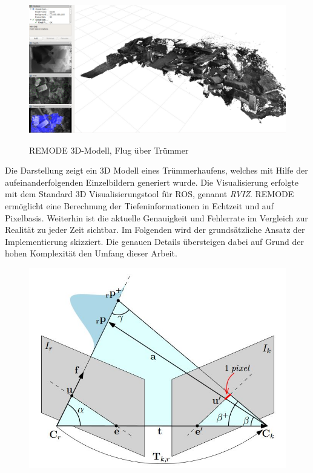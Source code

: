 \begin{figure}[ht]
	\centering
	\includegraphics[scale=0.22]{Bilder/remode_3dmodel.jpg}
	\label{fig:pinhole}
	\caption{REMODE 3D-Modell, Flug über Trümmer \cite{remode3d}}
\end{figure}

Die Darstellung zeigt ein 3D Modell eines Trümmerhaufens, welches mit Hilfe der aufeinanderfolgenden Einzelbildern generiert wurde. Die Visualisierung erfolgte mit dem Standard 3D Visualisierungstool für ROS, genannt \textit{RVIZ}. \newline
REMODE ermöglicht eine Berechnung der Tiefeninformationen in Echtzeit und auf Pixelbasis. Weiterhin ist die aktuelle Genauigkeit und Fehlerrate im Vergleich zur Realität zu jeder Zeit sichtbar. \newline
Im Folgenden wird der grundsätzliche Ansatz der Implementierung skizziert. Die genauen Details übersteigen dabei auf Grund der hohen Komplexität den Umfang dieser Arbeit.

\begin{figure}[ht]
	\centering
	\includegraphics[scale=0.7]{Bilder/REMODE_overview.jpg}
	\label{fig:radial}
\end{figure}

